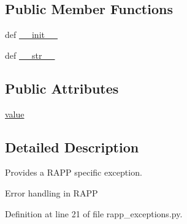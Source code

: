 \subsection*{Public Member Functions}
\begin{DoxyCompactItemize}
\item 
def \hyperlink{classrapp__speech__detection__sphinx4_1_1rapp__exceptions_1_1RappError_a96920fb0892c1070dc41c2d19a4d7535}{\-\_\-\-\_\-init\-\_\-\-\_\-}
\item 
def \hyperlink{classrapp__speech__detection__sphinx4_1_1rapp__exceptions_1_1RappError_aebed65d2df9d94ed1bd8f5c30b86a469}{\-\_\-\-\_\-str\-\_\-\-\_\-}
\end{DoxyCompactItemize}
\subsection*{Public Attributes}
\begin{DoxyCompactItemize}
\item 
\hyperlink{classrapp__speech__detection__sphinx4_1_1rapp__exceptions_1_1RappError_a2315c4cb6ee5f5681844294e1ac4c544}{value}
\end{DoxyCompactItemize}


\subsection{Detailed Description}
Provides a R\-A\-P\-P specific exception. 

\begin{DoxyVerb}Error handling in RAPP\end{DoxyVerb}
 

Definition at line 21 of file rapp\-\_\-exceptions.\-py.



